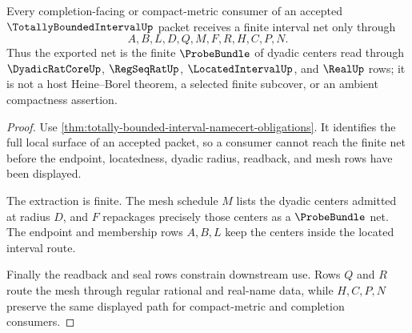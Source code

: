 \begin{theorem}
\label{thm:totally-bounded-interval-net-extraction}
Every completion-facing or compact-metric consumer of an accepted $\TotallyBoundedIntervalUp$ packet receives a finite interval net only through
$$
A,B,L,D,Q,M,F,R,H,C,P,N .
$$
Thus the exported net is the finite $\ProbeBundle$ of dyadic centers read through $\DyadicRatCoreUp$, $\RegSeqRatUp$, $\LocatedIntervalUp$, and $\RealUp$ rows; it is not a host Heine--Borel theorem, a selected finite subcover, or an ambient compactness assertion.
\end{theorem}
\begin{proof}
Use \autoref{thm:totally-bounded-interval-namecert-obligations}. It identifies the full local surface of an accepted packet, so a consumer cannot reach the finite net before the endpoint, locatedness, dyadic radius, readback, and mesh rows have been displayed.

The extraction is finite. The mesh schedule $M$ lists the dyadic centers admitted at radius $D$, and $F$ repackages precisely those centers as a $\ProbeBundle$ net. The endpoint and membership rows $A,B,L$ keep the centers inside the located interval route.

Finally the readback and seal rows constrain downstream use. Rows $Q$ and $R$ route the mesh through regular rational and real-name data, while $H,C,P,N$ preserve the same displayed path for compact-metric and completion consumers.
\end{proof}




